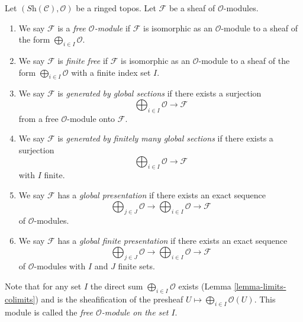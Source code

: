 \begin{definition}
\label{definition-global}
Let $(\textit{Sh}(\mathcal{C}), \mathcal{O})$ be a ringed topos.
Let $\mathcal{F}$ be a sheaf of $\mathcal{O}$-modules.
\begin{enumerate}
\item We say $\mathcal{F}$ is a {\it free $\mathcal{O}$-module}
if $\mathcal{F}$ is isomorphic as an $\mathcal{O}$-module
to a sheaf of the form $\bigoplus_{i \in I} \mathcal{O}$.
\item We say $\mathcal{F}$ is {\it finite free} if
$\mathcal{F}$ is isomorphic as an $\mathcal{O}$-module
to a sheaf of the form $\bigoplus_{i \in I} \mathcal{O}$
with a finite index set $I$.
\item We say $\mathcal{F}$ is {\it generated by global sections}
if there exists a surjection
$$
\bigoplus\nolimits_{i \in I} \mathcal{O} \longrightarrow \mathcal{F}
$$
from a free $\mathcal{O}$-module onto $\mathcal{F}$.
\item We say $\mathcal{F}$ is {\it generated by finitely many global sections}
if there exists a surjection
$$
\bigoplus\nolimits_{i \in I} \mathcal{O} \longrightarrow \mathcal{F}
$$
with $I$ finite.
\item We say $\mathcal{F}$ has a {\it global presentation}
if there exists an exact sequence
$$
\bigoplus\nolimits_{j \in J} \mathcal{O} \longrightarrow
\bigoplus\nolimits_{i \in I} \mathcal{O} \longrightarrow
\mathcal{F}
$$
of $\mathcal{O}$-modules.
\item We say $\mathcal{F}$ has a {\it global finite presentation}
if there exists an exact sequence
$$
\bigoplus\nolimits_{j \in J} \mathcal{O} \longrightarrow
\bigoplus\nolimits_{i \in I} \mathcal{O} \longrightarrow
\mathcal{F}
$$
of $\mathcal{O}$-modules with $I$ and $J$ finite sets.
\end{enumerate}
\end{definition}

\noindent
Note that for any set $I$ the direct sum
$\bigoplus_{i \in I} \mathcal{O}$ exists
(Lemma \ref{lemma-limits-colimits})
and is the sheafification of the presheaf
$U \mapsto \bigoplus_{i \in I} \mathcal{O}(U)$.
This module is called the {\it free $\mathcal{O}$-module on the set $I$}.

